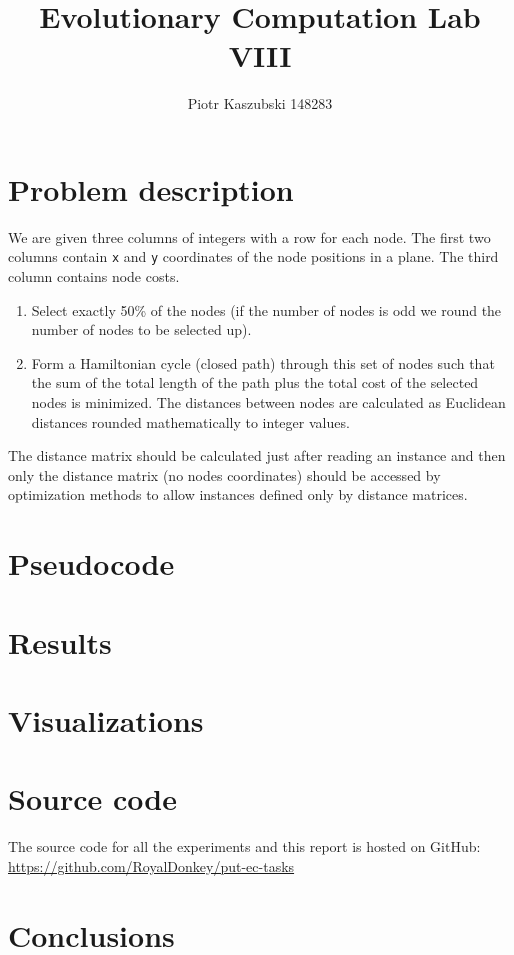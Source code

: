 \documentclass[14pt]{article}
\title{Evolutionary Computation Lab VIII}
\author{Piotr Kaszubski 148283}
\date{}
\begin{document}
\maketitle
\tableofcontents
\newpage

\section{Problem description}
We are given three columns of integers with a row for each node. The first two
columns contain \verb`x` and \verb`y` coordinates of the node positions in a
plane. The third column contains node costs.

\begin{enumerate}
	\item Select exactly 50\% of the nodes (if the number of nodes is odd we
		round the number of nodes to be selected up).
	\item Form a Hamiltonian cycle (closed path) through this set of nodes such
		that the sum of the total length of the path plus the total cost of the
		selected nodes is minimized. The distances between nodes are calculated
		as Euclidean distances rounded mathematically to integer values.
\end{enumerate}

The distance matrix should be calculated just after reading an instance and
then only the distance matrix (no nodes coordinates) should be accessed by
optimization methods to allow instances defined only by distance matrices.

\section{Pseudocode}

\section{Results}

\section{Visualizations}

\section{Source code}
The source code for all the experiments and this report is hosted on GitHub: \\
\url{https://github.com/RoyalDonkey/put-ec-tasks}

\section{Conclusions}
\end{document}
